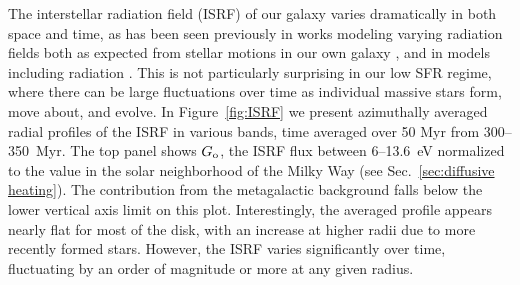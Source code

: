 \documentclass[twocolumn]{aastex61}
\begin{document}
The interstellar radiation field (ISRF) of our galaxy varies dramatically in both space and time, as has been seen previously in works modeling varying radiation fields both as expected from stellar motions in our own galaxy \citep{Parravano2003}, and in models including radiation \citep[e.g.][]{Hu2017}. This is not particularly surprising in our low SFR regime, where there can be large fluctuations over time as individual massive stars form, move about, and evolve. In Figure~\ref{fig:ISRF} we present azimuthally averaged radial profiles of the ISRF in various bands, time averaged over 50 Myr from 300--350~Myr. The top panel shows $G_{\rm o}$, the ISRF flux between 6--13.6~eV normalized to the value in the solar neighborhood of the Milky Way (see Sec.~\ref{sec:diffusive heating}). The contribution from the metagalactic background falls below the lower vertical axis limit on this plot. Interestingly, the averaged profile appears nearly flat for most of the disk, with an increase at higher radii due to more recently formed stars. However, the ISRF varies significantly over time, fluctuating by an order of magnitude or more at any given radius. 
\end{document}

